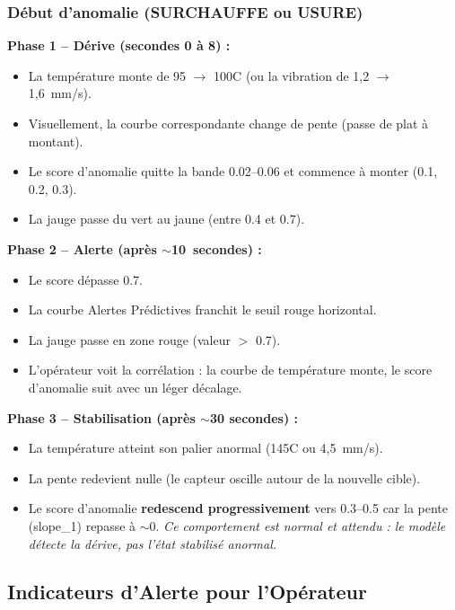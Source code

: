 \documentclass[11pt,a4paper]{article}
\begin{document}
\subsubsection{Début d'anomalie (SURCHAUFFE ou USURE)}

\textbf{Phase 1 -- Dérive (secondes 0 à 8) :}
\begin{itemize}
    \item La température monte de 95 $\rightarrow$ 100\textdegree C (ou la vibration de 1,2 $\rightarrow$ 1,6~mm/s).
    \item Visuellement, la courbe correspondante change de pente (passe de plat à montant).
    \item Le score d'anomalie quitte la bande 0.02--0.06 et commence à monter (0.1, 0.2, 0.3).
    \item La jauge passe du vert au jaune (entre 0.4 et 0.7).
\end{itemize}

\textbf{Phase 2 -- Alerte (après $\sim$10~secondes) :}
\begin{itemize}
    \item Le score dépasse 0.7.
    \item La courbe Alertes Prédictives franchit le seuil rouge horizontal.
    \item La jauge passe en zone rouge (valeur $>$ 0.7).
    \item L'opérateur voit la corrélation : la courbe de température monte, le score d'anomalie suit avec un léger décalage.
\end{itemize}

\textbf{Phase 3 -- Stabilisation (après $\sim$30 secondes) :}
\begin{itemize}
    \item La température atteint son palier anormal (145\textdegree C ou 4,5~mm/s).
    \item La pente redevient nulle (le capteur oscille autour de la nouvelle cible).
    \item Le score d'anomalie \textbf{redescend progressivement} vers 0.3--0.5 car la pente (slope\_1) repasse à $\sim$0. \textit{Ce comportement est normal et attendu : le modèle détecte la dérive, pas l'état stabilisé anormal.}
\end{itemize}

\subsection{Indicateurs d'Alerte pour l'Opérateur}
\end{document}
